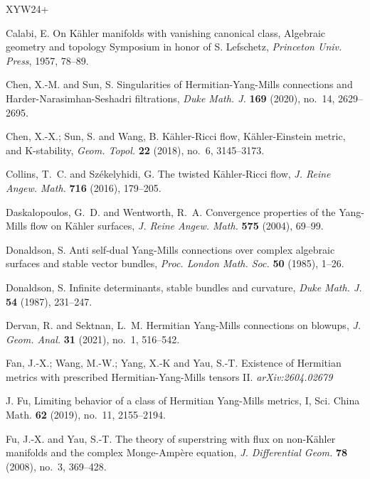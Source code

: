 \documentclass[12pt, reqno]{amsart}
\theoremstyle{plain}
\theoremstyle{definition}
\renewcommand{\>}{\rightarrow}
\renewcommand{\>}{\rightarrow}
\numberwithin{equation}{section} %
\begin{document}
\baselineskip
\begin{thebibliography}{XYW24+}

    Calabi, E.  On K\"ahler manifolds with vanishing canonical class,  Algebraic geometry and topology Symposium in honor of S. Lefschetz, \emph{Princeton Univ. Press}, 1957, 78--89.




    Chen, X.-M. and  Sun, S. Singularities of Hermitian-Yang-Mills connections and Harder-Narasimhan-Seshadri filtrations, \emph{Duke Math. J.} {\bf 169} (2020), no.~14, 2629--2695.



 Chen, X.-X.;  Sun, S.  and  Wang, B. K\"ahler-Ricci flow, K\"ahler-Einstein metric, and K-stability, \emph{Geom. Topol.} {\bf 22} (2018), no.~6, 3145--3173.

Collins, T.~C.  and Sz\'ekelyhidi, G.  The twisted K\"ahler-Ricci
flow, \emph{J. Reine Angew. Math.} {\bf 716} (2016), 179--205.


    Daskalopoulos, G.~D.  and Wentworth, R.~A.  Convergence properties of the Yang-Mills flow on K\"ahler surfaces, \emph{J. Reine Angew. Math.} {\bf 575} (2004), 69--99.



    Donaldson, S. Anti self-dual Yang-Mills connections over complex algebraic surfaces and stable vector bundles,
    \emph{Proc. London Math. Soc.} \textbf{50} (1985), 1--26.

    Donaldson, S.  Infinite determinants, stable bundles and curvature,
    \emph{Duke Math. J.} \textbf{54} (1987), 231--247.

    Dervan, R.  and  Sektnan, L.~M. Hermitian Yang-Mills connections on blowups, \emph{J. Geom. Anal.} {\bf 31} (2021), no.~1, 516--542.




     Fan, J.-X.; Wang, M.-W.; Yang, X.-K and Yau, S.-T.  Existence of Hermitian metrics  with  prescribed Hermitian-Yang-Mills tensors  II.  \emph{arXiv:2604.02679}

    J. Fu, Limiting behavior of a class of Hermitian Yang-Mills metrics, I, Sci. China Math. {\bf 62} (2019), no.~11, 2155--2194.

      Fu, J.-X.  and Yau, S.-T. The theory of superstring with flux on non-K\"ahler manifolds and the complex Monge-Amp\`ere equation, \emph{J. Differential Geom.} {\textbf {78}} (2008), no.~3, 369--428.


\end{thebibliography}
\end{document}
